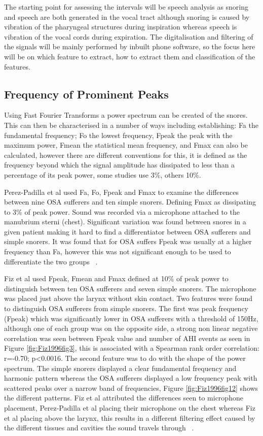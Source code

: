 The starting point for assessing the intervals will be speech analysis as snoring and speech are both generated in the vocal tract although snoring is caused by vibration of the pharyngeal structures during inspiration whereas speech is vibration of the vocal cords during expiration. The digitalisation and filtering of the signals will be mainly performed by inbuilt phone software, so the focus here will be on which feature to extract, how to extract them and classification of the features. 

\subsection{Frequency of Prominent Peaks}
Using Fast Fourier Transforms a power spectrum can be created of the snores. This can then be characterised in a number of ways including establishing: Fa the fundamental frequency; Fo the lowest frequency, Fpeak the peak with the maximum power, Fmean the statistical mean frequency, and Fmax can also be calculated, however there are different conventions for this, it is defined as the frequency beyond which the signal amplitude has dissipated to less than a percentage of its peak power, some studies use 3\%, others 10\%. 

Perez-Padilla et al used Fa, Fo, Fpeak and Fmax to examine the differences between nine OSA sufferers and ten simple snorers. Defining Fmax as dissipating to 3\% of peak power. Sound was recorded via a microphone attached to the manubrium sterni (chest). Significant variation was found between snores in a given patient making it hard to find a differentiator between OSA sufferers and simple snorers. It was found that for OSA suffers Fpeak was usually at a higher frequency than Fa, however this was not significant enough to be used to differentiate the two groups ~\cite{whitelaw1993characteristics}.

Fiz et al used Fpeak, Fmean and Fmax defined at 10\% of peak power to distinguish between ten OSA sufferers and seven simple snorers. The microphone was placed just above the larynx without skin contact. Two features were found to distinguish OSA sufferers from simple snorers. The first was peak frequency (Fpeak) which was significantly lower in OSA sufferers with a threshold of 150Hz, although one of each group was on the opposite side, a strong non linear negative correlation was seen between Fpeak value and number of AHI events as seen in Figure \ref{fig:Fiz1996fig3}, this is associated with a Spearman rank order correlation: r=-0.70; p<0.0016. The second feature was to do with the shape of the power spectrum. The simple snorers displayed a clear fundamental frequency and harmonic pattern whereas the OSA sufferers displayed a low frequency peak with scattered peaks over a narrow band of frequencies, Figure \ref{fig:Fiz1996fig12} shows the different patterns. Fiz et al attributed the differences seen to microphone placement, Perez-Padilla et al placing their microphone on the chest whereas Fiz et al placing above the larynx, this results in a different filtering effect caused by the different tissues and cavities the sound travels through ~\cite{fiz1996acoustic}.

